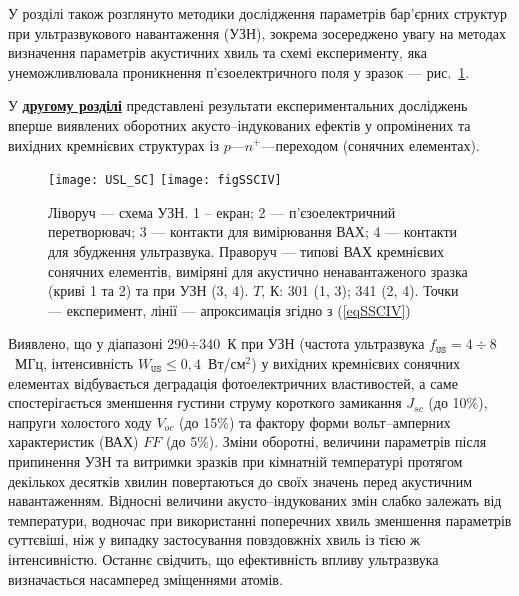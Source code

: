 У розділі також розглянуто методики дослідження параметрів бар'єрних структур при ультразвукового навантаження (УЗН),
зокрема зосереджено увагу на методах визначення параметрів акустичних хвиль та
схемі експерименту, яка унеможливлювала проникнення п'єзоелектричного поля у зразок --- рис.~\ref{USL_SC}.

У  \underline{\textbf{другому розділі}} представлені результати експериментальних досліджень вперше виявлених оборотних акусто--індукованих ефектів у опромінених та вихідних кремнієвих структурах із  $p$---$n^+$---переходом (сонячних елементах).

\begin{figure}[b]
\center
\texttt{[image: USL\_SC]} \hfill
\texttt{[image: figSSCIV]}
\caption{\label{USL_SC}
Ліворуч --- схема УЗН.
1 --  екран;
2 --- п'єзоелектричний перетворювач;
3 --- контакти для вимірювання ВАХ;
4 --- контакти для збудження ультразвука.
Праворуч --- типові ВАХ кремнієвих сонячних елементів, виміряні для акустично ненавантаженого зразка (криві 1 та 2) та
при УЗН (3, 4).
$T$, К: 301 (1, 3); 341 (2, 4).
Точки --- експеримент, лінії --- апроксимація згідно з (\ref{eqSSCIV})
}%
\end{figure}

Виявлено, що
   у діапазоні 290$\div$340~К при УЗН (частота ультразвука $f_\mathtt{US}=4\div8$~МГц, інтенсивність $W_\mathtt{US}\leq0,4$~Вт/см$^2$) у вихідних кремнієвих сонячних елементах  відбувається деградація
фотоелектричних властивостей, а саме
спостерігається зменшення густини струму короткого замикання $J_{sc}$ (до 10\%), напруги холостого ходу $V_{oc}$ (до 15\%) та фактору форми вольт--амперних характеристик (ВАХ) $F\!F$ (до 5\%).
Зміни оборотні, величини параметрів  після припинення УЗН  та витримки зразків при кімнатній температурі протягом декількох десятків хвилин повертаються до своїх значень перед акустичним навантаженням.
Відносні величини акусто--індукованих змін слабко залежать від температури, водночас при використанні поперечних хвиль зменшення параметрів суттєвіші, ніж у випадку застосування повздовжніх хвиль із тією ж інтенсивністю.
Останнє свідчить, що ефективність впливу ультразвука визначається насамперед зміщеннями атомів.

